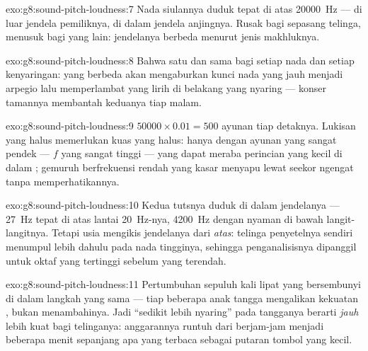 \begin{solution}{exo:g8:sound-pitch-loudness:7}
Nada siulannya duduk tepat di atas \qty{20000}{Hz} --- di luar jendela
pemiliknya, di dalam jendela anjingnya. Rusak bagi sepasang telinga,
menusuk bagi yang lain: jendelanya berbeda menurut jenis makhluknya.
\end{solution}

\begin{solution}{exo:g8:sound-pitch-loudness:8}
Bahwa  satu dan sama bagi setiap nada dan setiap
kenyaringan:  yang berbeda akan mengaburkan kunci nada yang
jauh menjadi arpegio lalu memperlambat yang lirih di belakang yang
nyaring --- konser tamannya membantah keduanya tiap malam.
\end{solution}

\begin{solution}{exo:g8:sound-pitch-loudness:9}
$50000 \times 0.01 = 500$ ayunan tiap detaknya. Lukisan yang halus
memerlukan kuas yang halus: hanya  dengan ayunan yang sangat
pendek --- $f$ yang sangat tinggi --- yang dapat meraba perincian yang
kecil di dalam ; gemuruh berfrekuensi rendah yang kasar
menyapu lewat seekor ngengat tanpa memperhatikannya.
\end{solution}

\begin{solution}{exo:g8:sound-pitch-loudness:10}
Kedua tutsnya duduk di dalam jendelanya --- \qty{27}{Hz} tepat di atas
lantai \qty{20}{Hz}-nya, \qty{4200}{Hz} dengan nyaman di bawah
langit-langitnya. Tetapi usia mengikis jendelanya dari \emph{atas}:
telinga penyetelnya sendiri menumpul lebih dahulu pada nada tingginya,
sehingga penganalisisnya dipanggil untuk oktaf yang tertinggi sebelum
yang terendah.
\end{solution}

\begin{solution}{exo:g8:sound-pitch-loudness:11}
Pertumbuhan sepuluh kali lipat yang bersembunyi di dalam langkah yang
sama --- tiap beberapa anak tangga mengalikan kekuatan , bukan
menambahinya. Jadi ``sedikit lebih nyaring'' pada tangganya berarti
\emph{jauh} lebih kuat bagi telinganya: anggarannya runtuh dari
berjam-jam menjadi beberapa menit sepanjang apa yang terbaca sebagai
putaran tombol yang kecil.
\end{solution}


